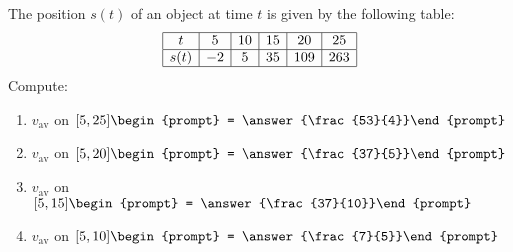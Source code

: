 \documentclass{ximera}
\author{Bart Snapp}
\begin{document}
\begin{exercise}
The position $s(t)$ of an object at time $t$ is given by the following table:
\[
\begin{array}{|c|c|c|c|c|c|}\hline
t &5 &10 &15 &20 &25 \\ \hline
s(t) &-2 &5 & 35&109 & 263\\ \hline
\end{array}
\]
Compute:
\begin{enumerate}
\item $v_{\mathrm{av}}$ on $[5,25]\begin{prompt} = \answer{\frac{53}{4}}\end{prompt}$
\item $v_{\mathrm{av}}$ on $[5,20]\begin{prompt} = \answer{\frac{37}{5}}\end{prompt}$
\item $v_{\mathrm{av}}$ on $[5,15]\begin{prompt} = \answer{\frac{37}{10}}\end{prompt}$
\item $v_{\mathrm{av}}$ on $[5,10]\begin{prompt} = \answer{\frac{7}{5}}\end{prompt}$
\end{enumerate}
\end{exercise}
\end{document}
